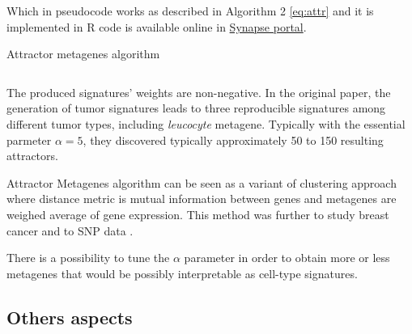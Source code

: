 \documentclass[12pt,]{book}
\theoremstyle{definition}
\theoremstyle{definition}
\theoremstyle{definition}
\theoremstyle{remark}
\begin{document}
Which in pseudocode works as described in Algorithm 2 \eqref{eq:attr} and
it is implemented in R code is available online in
\href{https://www.synapse.org/\#!Synapse:syn1446295}{Synapse portal}.

\begin{algorithm}
  \caption{ Attractor metagenes algorithm}
  \begin{algorithmic}[2]

    \begin{equation}\label{eq:attr}\end{equation}
     
     
     
    \Repeat 

  \end{algorithmic}

\end{algorithm}

The produced signatures' weights are non-negative. In the original
paper, the generation of tumor signatures leads to three reproducible
signatures among different tumor types, including \emph{leucocyte}
metagene. Typically with the essential parmeter \(\alpha=5\), they
discovered typically approximately 50 to 150 resulting attractors.

Attractor Metagenes algorithm can be seen as a variant of clustering
approach where distance metric is mutual information between genes and
metagenes are weighed average of gene expression. This method was
further to study breast cancer \citep{AlEjeh2014} and to SNP data
\citep{Elmas2016}.

There is a possibility to tune the \(\alpha\) parameter in order to
obtain more or less metagenes that would be possibly interpretable as
cell-type signatures.

\hypertarget{others-aspects}{%
\subsection{Others aspects}\label{others-aspects}}
\end{document}
